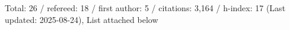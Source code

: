 Total: 26 / refereed: 18 / first author: 5 / citations: 3,164 / h-index: 17 (Last updated: 2025-08-24), List attached below